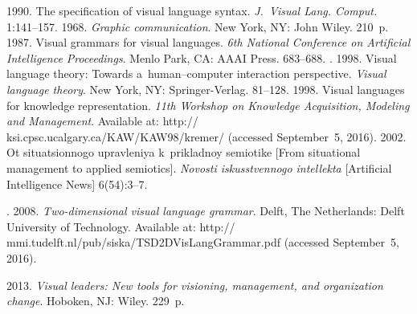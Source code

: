   \begin{multicols}{2}

\renewcommand{\bibname}{\protect\rmfamily References}

{\small\frenchspacing
 {%
 \begin{thebibliography}{99}
  
   1990. The specification of visual language 
syntax. \textit{J.~Visual Lang. Comput.} 1:141--157.
   1968. \textit{Graphic communication}. New York, NY: 
John Wiley. 210~p.
   1987. Visual grammars for visual languages. \textit{6th National 
Conference on Artificial Intelligence Proceedings}. Menlo Park, 
CA: AAAI Press. 683--688. 
  . 1998. Visual language theory: Towards 
a~human--computer interaction perspective. \textit{Visual language theory}. New 
York, NY: Springer-Verlag. 81--128.
   1998. Visual languages for knowledge representation. 
\textit{11th Workshop on Knowledge Acquisition, Modeling and Management}. Available at: 
{\sf http:// ksi.cpsc.ucalgary.ca/KAW/KAW98/kremer/} (accessed September~5, 2016).
   2002. Ot situatsionnogo upravleniya k~prikladnoy semiotike 
[From situational management to applied semiotics]. \textit{Novosti iskusstvennogo 
intellekta} [Artificial Intelligence News] 6(54):3--7.

  . 2008.
  \textit{Two-dimensional visual language 
grammar}. Delft, The Netherlands: Delft University of Technology.
Available at: {\sf http:// mmi.tudelft.nl/pub/siska/TSD2DVisLangGrammar.pdf} 
(accessed September~5, 2016).

 
   2013. \textit{Visual leaders: New tools for visioning, 
management, and organization change}. Hoboken, NJ: Wiley. 229~p.
  

\end{thebibliography}}}
\end{multicols}
